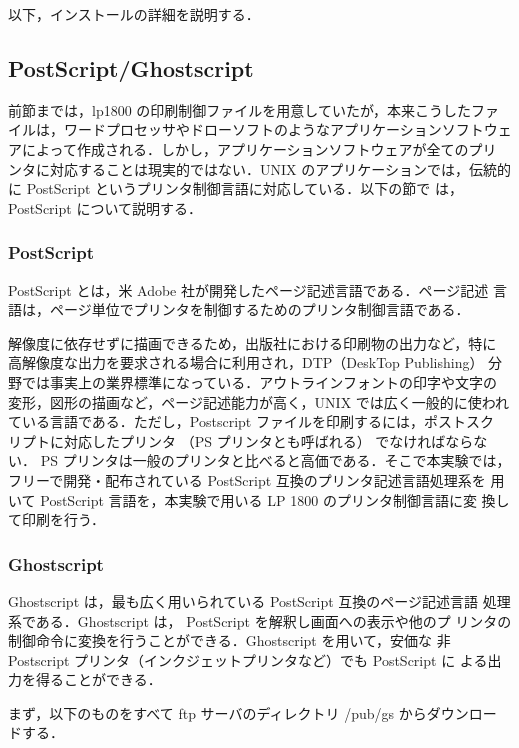 以下，インストールの詳細を説明する．

\subsection*{PostScript/Ghostscript}

前節までは，lp1800 の印刷制御ファイルを用意していたが，本来こうしたファ
イルは，ワードプロセッサやドローソフトのようなアプリケーションソフトウェ
アによって作成される．しかし，アプリケーションソフトウェアが全てのプリ
ンタに対応することは現実的ではない．UNIX のアプリケーションでは，伝統的
に PostScript というプリンタ制御言語に対応している．以下の節で
は，PostScript について説明する．

\subsubsection*{PostScript}

PostScript とは，米 Adobe 社が開発したページ記述言語である．ページ記述
言語は，ページ単位でプリンタを制御するためのプリンタ制御言語である．

解像度に依存せずに描画できるため，出版社における印刷物の出力など，特に
高解像度な出力を要求される場合に利用され，DTP（DeskTop Publishing） 分
野では事実上の業界標準になっている．アウトラインフォントの印字や文字の
変形，図形の描画など，ページ記述能力が高く，UNIX では広く一般的に使われ
ている言語である．ただし，Postscript ファイルを印刷するには，ポストスク
リプトに対応したプリンタ （PS プリンタとも呼ばれる） でなければならな
い． PS プリンタは一般のプリンタと比べると高価である．そこで本実験では，
フリーで開発・配布されている PostScript 互換のプリンタ記述言語処理系を
用いて PostScript 言語を，本実験で用いる LP 1800 のプリンタ制御言語に変
換して印刷を行う．

\subsubsection*{Ghostscript}

Ghostscript は，最も広く用いられている PostScript 互換のページ記述言語
処理系である．Ghostscript は， PostScript を解釈し画面への表示や他のプ
リンタの制御命令に変換を行うことができる．Ghostscript を用いて，安価な
非 Postscript プリンタ（インクジェットプリンタなど）でも PostScript に
よる出力を得ることができる．

まず，以下のものをすべて ftp サーバのディレクトリ /pub/gs からダウンロー
ドする．


